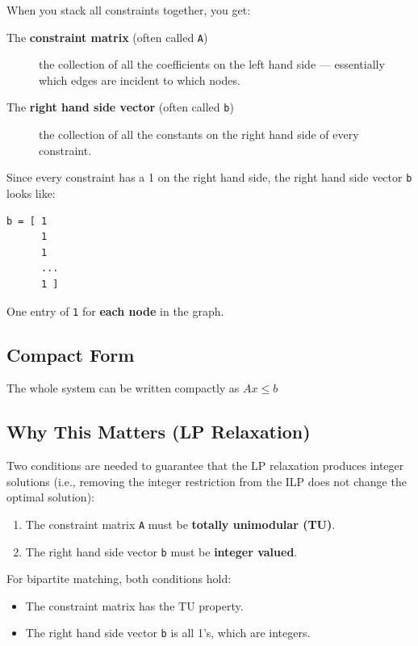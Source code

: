 \documentclass[11pt]{article}
\begin{document}
When you stack all constraints together, you get:

\begin{description}
\item[{The \textbf{constraint matrix} (often called \texttt{A})}] the collection of all the
coefficients on the left hand side — essentially which edges are incident
to which nodes.

\item[{The \textbf{right hand side vector} (often called \texttt{b})}] the collection of all
the constants on the right hand side of every constraint.
\end{description}

Since every constraint has a 1 on the right hand side, the right hand side
vector \texttt{b} looks like:

\begin{verbatim}
b = [ 1
      1
      1
      ...
      1 ]
\end{verbatim}

One entry of \texttt{1} for \textbf{each node} in the graph.

\subsection{Compact Form}
\label{sec:org96520d2}

The whole system can be written compactly as \(A x \leq b\)


\subsection{Why This Matters (LP Relaxation)}
\label{sec:org9006c61}

Two conditions are needed to guarantee that the LP relaxation produces
integer solutions (i.e., removing the integer restriction from the ILP
does not change the optimal solution):

\begin{enumerate}
\item The constraint matrix \texttt{A} must be \textbf{totally unimodular (TU)}.
\item The right hand side vector \texttt{b} must be \textbf{integer valued}.
\end{enumerate}

For bipartite matching, both conditions hold:
\begin{itemize}
\item The constraint matrix has the TU property.
\item The right hand side vector \texttt{b} is all 1's, which are integers.
\end{itemize}
\end{document}
